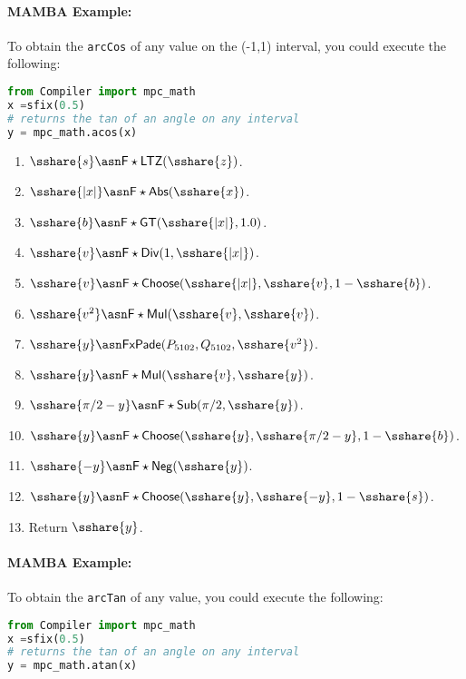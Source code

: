 \paragraph{MAMBA Example:} To obtain the \verb|arcCos| of any value on the (-1,1) interval, you could execute the following:
\begin{lstlisting}[language={python}]
from Compiler import mpc_math
x =sfix(0.5)
# returns the tan of an angle on any interval
y = mpc_math.acos(x)
\end{lstlisting}

\begin{enumerate}
\item $\sshare{s} \asn \mathsf{F\star LTZ}(\sshare{z})$.
\item $\sshare{|x|} \asn \mathsf{F\star Abs}(\sshare{x})$.
\item $\sshare{b} \asn \mathsf{F\star GT}(\sshare{|x|},1.0)$.
\item $\sshare{v} \asn \mathsf{F\star Div}(1,\sshare{|x|})$.
\item $\sshare{v} \asn \mathsf{F\star Choose}(\sshare{|x|},\sshare{v},1-\sshare{b})$.
\item $\sshare{v^2} \asn \mathsf{F\star Mul}(\sshare{v},\sshare{v})$.
\item $\sshare{y} \asn \mathsf{FxPade}(P_{5102},Q_{5102},\sshare{v^2})$.
\item $\sshare{y} \asn \mathsf{F\star Mul}(\sshare{v},\sshare{y})$.
\item $\sshare{\pi/2-y} \asn \mathsf{F\star Sub}(\pi/2,\sshare{y})$.
\item $\sshare{y} \asn \mathsf{F\star Choose}(\sshare{y},\sshare{\pi/2-y},1-\sshare{b})$.
\item $\sshare{-y} \asn \mathsf{F\star Neg}(\sshare{y})$.
\item $\sshare{y} \asn \mathsf{F\star Choose}(\sshare{y},\sshare{-y},1-\sshare{s})$.
\item Return $\sshare{y}$.
\end{enumerate}

\paragraph{MAMBA Example:} To obtain the \verb|arcTan| of any value, you could execute the following:
\begin{lstlisting}[language={python}]
from Compiler import mpc_math
x =sfix(0.5)
# returns the tan of an angle on any interval
y = mpc_math.atan(x)
\end{lstlisting}
